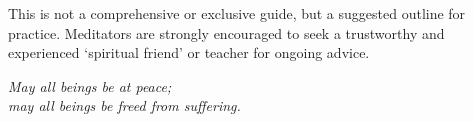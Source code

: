 
This is not a comprehensive or exclusive guide, but a suggested outline
for practice. Meditators are strongly encouraged to seek a trustworthy
and experienced `spiritual friend' or teacher for ongoing advice.

\emph{May all beings be at peace;\\ may all beings be freed from
suffering.}
